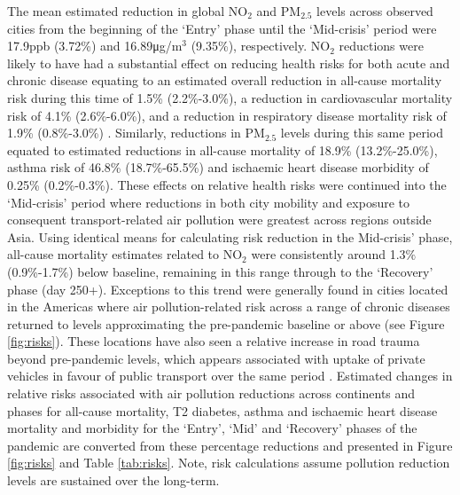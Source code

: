 \documentclass[preprint,10pt]{elsarticle} %
\begin{document}
The mean estimated reduction in global NO$_{2}$ and PM$_{2.5}$ levels across observed cities from the beginning of the `Entry' phase until the `Mid-crisis' period were 17.9ppb (3.72\%) and 16.89\si{\micro\gram}/m$^{3}$ (9.35\%), respectively. NO$_{2}$ reductions were likely to have had a substantial effect on reducing health risks for both acute and chronic disease equating to an estimated overall reduction in all-cause mortality risk during this time of 1.5\% (2.2\%-3.0\%), a reduction in cardiovascular mortality risk of 4.1\% (2.6\%-6.0\%), and a reduction in respiratory disease mortality risk of 1.9\% (0.8\%-3.0\%) \cite{Huang19Pollution}. Similarly, reductions in PM$_{2.5}$ levels during this same period equated to estimated reductions in all-cause mortality of 18.9\% (13.2\%-25.0\%)\cite{Yu2020PM2.5}, asthma risk of 46.8\% (18.7\%-65.5\%) and ischaemic heart disease morbidity of 0.25\% (0.2\%-0.3\%)\cite{Xie257}. These effects on relative health risks were continued into the `Mid-crisis' period where reductions in both city mobility and exposure to consequent transport-related air pollution were greatest across regions outside Asia. Using identical means for calculating risk reduction in the Mid-crisis' phase, all-cause mortality estimates related to NO$_{2}$ were consistently around 1.3$\%$ (0.9\%-1.7\%) below baseline, remaining in this range through to the `Recovery' phase (day 250+). Exceptions to this trend were generally found in cities located in the Americas where air pollution-related risk across a range of chronic diseases returned to levels approximating the pre-pandemic baseline or above (see Figure \ref{fig:risks}). These locations have also seen a relative increase in road trauma beyond pre-pandemic levels, which appears associated with uptake of private vehicles in favour of public transport over the same period \cite{ITFRS2023,saladie2023back,DAS20211}. Estimated changes in relative risks associated with air pollution reductions across continents and phases for all-cause mortality, T2 diabetes, asthma and ischaemic heart disease mortality and morbidity for the `Entry', `Mid' and `Recovery' phases of the pandemic are converted from these percentage reductions and presented in Figure \ref{fig:risks} and Table \ref{tab:risks}. Note, risk calculations assume pollution reduction levels are sustained over the long-term.
\end{document}
